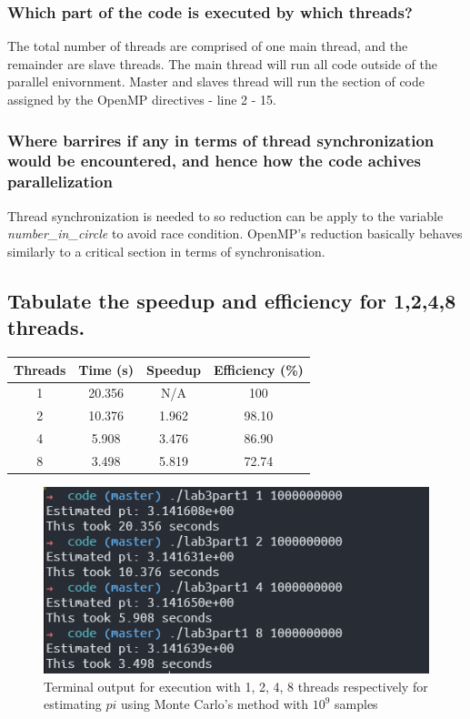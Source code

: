 \subsubsection{Which part of the code is executed by which threads?}
The total number of threads are comprised of one main thread, and the remainder are slave threads.
The main thread will run all code outside of the parallel enivornment. Master and slaves thread will 
run the section of code assigned by the OpenMP directives - line 2 - 15.

\subsubsection{Where barrires if any in terms of thread synchronization would be encountered,
and hence how the code achives parallelization}

Thread synchronization is needed to so reduction can be apply to the variable
\emph{number\_in\_circle} to avoid race condition. OpenMP's reduction basically
behaves similarly to a critical section in terms of synchronisation.


\subsection{Tabulate the speedup and efficiency for 1,2,4,8 threads.}

\begin{center}
\begin{tabular}{|| c | c | c | c ||}
	\hline
	Threads & Time (s) & Speedup & Efficiency (\%) \\ [0.5ex]
	\hline 
	1 & 20.356 & N/A & 100 \\
	2 & 10.376 & 1.962 & 98.10 \\
	4 & 5.908 & 3.476 & 86.90 \\
	8 & 3.498 & 5.819 & 72.74 \\
	\hline
\end{tabular}
\end{center}

\begin{figure}[ht]
	\centering
	\includegraphics[width=\textwidth]{graphics/P1_c_terminal_output.PNG}
	\caption{Terminal output for execution with 1, 2, 4, 8 threads respectively for
	estimating $pi$ using Monte Carlo's method with $10^9$ samples}
	\label{fig:lab3part1c}
\end{figure}

